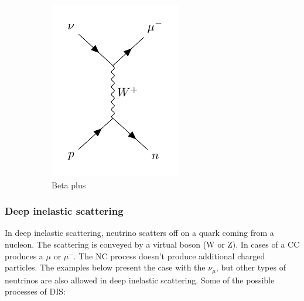 \begin{figure}[H]
\begin{subfigure}[b]{0.28\textwidth}
    \includegraphics[width=\linewidth]{figures/assets/feyman_graphs/CCQE-anti.pdf}
\caption{Beta plus}
   \label{plot:ccqe_m}
  \end{subfigure}
  \caption[Beta decay]{\@TODO  }

    \label{plot:CCQE}
\end{figure}


  \subsubsection{Deep inelastic scattering}
\label{sec:DIS}

In deep inelastic scattering, neutrino scatters off on a quark coming from a nucleon.
The scattering is conveyed by a virtual boson (W or Z). In cases of a CC produces a $\mu$ or $\mu^{-}$.
The NC process doesn't produce additional charged particles.
The examples below present the case with the $\nu_{\mu}$, but other types of neutrinos are also allowed in deep inelastic scattering.
Some of the possible processes of DIS:

